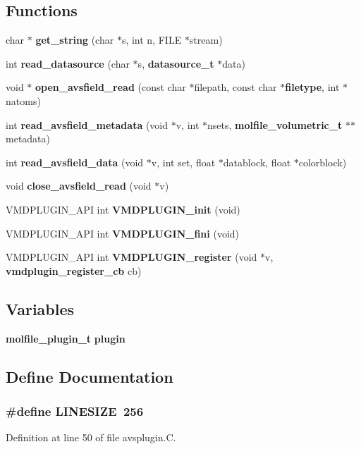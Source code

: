\subsection*{Functions}
\begin{CompactItemize}
\item 
char $\ast$ {\bf get\_\-string} (char $\ast$s, int n, FILE $\ast$stream)
\item 
int {\bf read\_\-datasource} (char $\ast$s, {\bf datasource\_\-t} $\ast$data)
\item 
void $\ast$ {\bf open\_\-avsfield\_\-read} (const char $\ast$filepath, const char $\ast${\bf filetype}, int $\ast$natoms)
\item 
int {\bf read\_\-avsfield\_\-metadata} (void $\ast$v, int $\ast$nsets, {\bf molfile\_\-volumetric\_\-t} $\ast$$\ast$metadata)
\item 
int {\bf read\_\-avsfield\_\-data} (void $\ast$v, int set, float $\ast$datablock, float $\ast$colorblock)
\item 
void {\bf close\_\-avsfield\_\-read} (void $\ast$v)
\item 
VMDPLUGIN\_\-API int {\bf VMDPLUGIN\_\-init} (void)
\item 
VMDPLUGIN\_\-API int {\bf VMDPLUGIN\_\-fini} (void)
\item 
VMDPLUGIN\_\-API int {\bf VMDPLUGIN\_\-register} (void $\ast$v, {\bf vmdplugin\_\-register\_\-cb} cb)
\end{CompactItemize}
\subsection*{Variables}
\begin{CompactItemize}
\item 
{\bf molfile\_\-plugin\_\-t} {\bf plugin}
\end{CompactItemize}


\subsection{Define Documentation}
\subsubsection{\setlength{\rightskip}{0pt plus 5cm}\#define LINESIZE\ 256}\label{avsplugin_8C_a0}




Definition at line 50 of file avsplugin.C.

